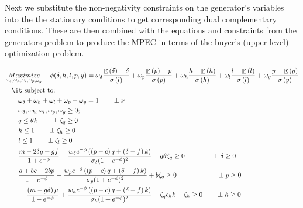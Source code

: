 \documentclass[informs]{informs3}
\begin{document}
Next we  substitute the non-negativity constraints on the generator's variables into the the stationary conditions to get corresponding dual complementary conditions. These are then combined with the equations and constraints from the generators problem to produce the MPEC in terms of the buyer's (upper level)  optimization problem.

\begin{subequations}\label{eqBuyersMPEC}
	\begin{align}
	&\mathop {Maximize}\limits_{\omega_{\delta},\omega_{h},\omega_{l},\omega_{p,\omega_{y}}}
	\quad \phi(\delta, h, l, p, y) =  	 \omega_{\delta}\frac{\mathop{\mathbb{E}}\left(\delta\right)-\delta }
	{\sigma\left(l\right)}+\omega_{p}\frac{\mathop{\mathbb{E}}\left(p\right)-p}  {\sigma\left(p\right)} 
	+\omega_{h}\frac{ h-\mathop{\mathbb{E}}\left(h\right)}
	{\sigma\left(h\right)}+\omega_{l}\frac{ l-\mathop{\mathbb{E}}\left(l\right) }{\sigma\left(l\right)}+\omega_{y}\frac{y-\mathop{\mathbb{E}}\left(y\right)}{\sigma\left(y\right)} \label{eqBuyerObjective}\\
	&\quad \mbox{{\it subject to}:}\notag\\
 	&\qquad	 \omega_{\delta}+\omega_{h}+\omega_{l}+\omega_{p}+\omega_{y}=1\label{eqBuyerNormal} \qquad \perp \nu\\
	&\qquad  \omega_{\delta},\omega_{h},\omega_{l},\omega_{p},\omega_{y} \geq 0;\\
    &\qquad q \leq \theta k	\label{eqBuyerEnergySupply2} 	\qquad \perp \zeta_q\geq 0\\
    &\qquad   h \leq 1 \label{eqGeneratorFinance2}		\qquad \perp \zeta_h\geq 0\\
	&\qquad   l \leq 1 \label{eqGeneratorLocal2}			\qquad \perp \zeta_l\geq 0\\
    & \qquad  \frac{m-2\delta g + g f}{1+e^{-\phi}}-\frac{w_{\delta} e^{-\phi} \left(\left(p-c\right)q +\left(\delta-f\right)k\right)}{\sigma_{\delta}(1+e^{-\phi})^{2}}-g \theta \zeta_q  \geq 0 \qquad\qquad \perp \delta \geq 0\\
    &\qquad \frac{a+bc-2bp}{1+e^{-\phi}}-\frac{w_p e^{-\phi} \left(\left(p-c\right)q+\left(\delta-f\right)k\right)}{\sigma_{p}(1+e^{-\phi})^{2}}+b \zeta_q  \geq 0 \qquad\qquad\qquad \perp p \geq 0\\
    & \qquad -\frac{\left(m-g\delta\right)\mu}{1+e^{-\phi}}+{\frac{w_h e^{-\phi} \left(\left(p-c\right)q +\left(\delta-f\right)k\right)}{\sigma_{h}(1+e^{-\phi})^{2}}}+\zeta_q \epsilon_h k-\zeta_h \geq 0 \qquad \perp h\geq 0\\

\end{align}
\end{subequations}
\end{document}
